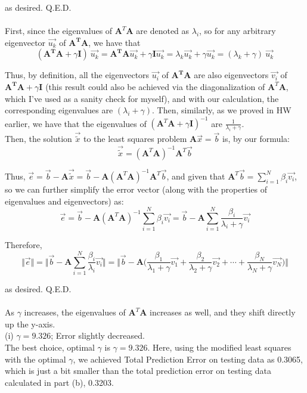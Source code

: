 \documentclass{article}
\begin{document}
as desired. Q.E.D. \\

 \\

First, since the eigenvalues of $\mathbf{A}^T\mathbf{A}$ are denoted as $\lambda_i$, so for any arbitrary eigenvector $\vec{u_k}$ of $\mathbf{A^T}\mathbf{A}$, we have that
$$(\mathbf{A^T}\mathbf{A} + \gamma\mathbf{I})\ \vec{u_k} =
\mathbf{A^T}\mathbf{A} \vec{u_k} +
	\gamma\mathbf{I} \vec{u_k} =
\lambda_k \vec{u_k} + \gamma \vec{u_k} =
(\lambda_k + \gamma)\ \vec{u_k} $$

Thus, by definition, all the eigenvectors $\vec{u_i}$ of $\mathbf{A^T}\mathbf{A}$ are also eigenvectors $\vec{v_i}$ of $\mathbf{A^T}\mathbf{A} + \gamma\mathbf{I}$
(this result could also be achieved via the diagonalization of $\mathbf{A}^T\mathbf{A}$, which I've used as a sanity check for myself),
and with our calculation, the corresponding eigenvalues are
$(\lambda_i + \gamma)$.
Then, similarly, as we proved in HW earlier, we have that the eigenvalues of
$(\mathbf{A}^T\mathbf{A} + \gamma\mathbf{I})^{-1}$ are
$\frac{1}{\lambda_i + \gamma}$. \\

Then, the solution $\vec{\tilde{x}}$ to the least squares problem $\mathbf{A}\vec{x} = \vec{b}$ is, by our formula:
$$\vec{\tilde{x}} =
(\mathbf{A}^T \mathbf{A})^{-1} \mathbf{A}^T \vec{b}$$

Thus, $\vec{e} = \vec{b} - \mathbf{A}\vec{\tilde{x}} =
\vec{b} - \mathbf{A} (\mathbf{A}^T \mathbf{A})^{-1} \mathbf{A}^T \vec{b}$, and given that
$\mathbf{A}^T \vec{b} =
	\sum\limits_{i=1}^{N} \beta_i\vec{v_i}$,
so we can further simplify the error vector (along with the properties of eigenvalues and eigenvectors) as:
$$\vec{e} =
\vec{b} - \mathbf{A} (\mathbf{A}^T \mathbf{A})^{-1}
	\sum\limits_{i=1}^{N} \beta_i\vec{v_i} =
\vec{b} - \mathbf{A}
	\sum\limits_{i=1}^N \frac{\beta_i}{\lambda_i + \gamma} \vec{v_i} $$

Therefore,
$$\Vert \vec{e} \Vert =
\Vert \vec{b} - \mathbf{A}
	\sum\limits_{i=1}^N \frac{\beta_i}{\lambda_i} \vec{v_i}
	\Vert =
\Big\Vert \vec{b} - \mathbf{A} \big(
	\frac{\beta_1}{\lambda_1 + \gamma} \vec{v_1} +
	\frac{\beta_2}{\lambda_2 + \gamma} \vec{v_2} + \cdots +
	\frac{\beta_N}{\lambda_N + \gamma}\vec{v_N}
\big) \Big\Vert$$

as desired. Q.E.D. \\


 \\

As $\gamma$ increases, the eigenvalues of $\mathbf{A}^T\mathbf{A}$ increases as well, and they shift directly up the y-axis. \\[.5cm]
{\color{red} (i) $\gamma = 9.326$; Error slightly decreased. } \\

The best choice, optimal $\gamma$ is {\color{blue} $\gamma = 9.326$}. Here, using the modified least squares with the optimal $\gamma$, we achieved Total Prediction Error on testing data as {\color{blue} 0.3065}, which is just a bit smaller than the total prediction error on testing data calculated in part (b), 0.3203.
\end{document}
